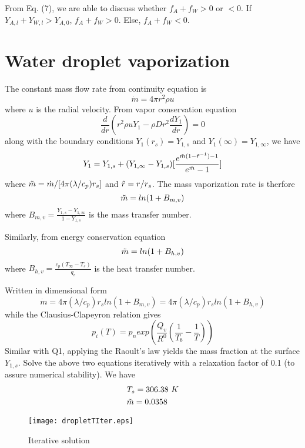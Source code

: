 \documentclass{article}
\begin{document}
From Eq. (7), we are able to discuss whether $f_A+f_W>0$ or $<0$. If $Y_{A,l}+Y_{W,l}>Y_{A,0}$, $f_A+f_W>0$. Else, $f_A+f_W<0$.



\section{Water droplet vaporization}
The constant mass flow rate from continuity equation is
\begin{equation}
    \dot{m}=4\pi r^2 \rho u
\end{equation}
where $u$ is the radial velocity. From vapor conservation equation
\begin{equation}
    \frac{d}{dr}(r^2\rho u Y_1-\rho Dr^2\frac{dY_1}{dr})=0
\end{equation}
along with the boundary conditions $Y_1(r_s)=Y_{1,s}$ and $Y_1(\infty)=Y_{1,\infty}$, we have
\begin{equation}
    Y_1 = Y_{1,s}+(Y_{1,\infty}-Y_{1,s})[\frac{e^{\Tilde{m}(1-\Tilde{r}^{-1})-1}}{e^{\Tilde{m}}-1}]
\end{equation}
where $\Tilde{m}=\dot{m}/[4\pi (\lambda /c_p)r_s]$ and $\Tilde{r}=r/r_s$.
The mass vaporization rate is therfore
\begin{equation}
    \Tilde{m}=ln(1+B_{m,v})
\end{equation}
where $B_{m,v}=\frac{Y_{1,s}-Y_{1,\infty}}{1-Y_{1,s}}$ is the mass transfer number.

Similarly, from energy conservation equation
\begin{equation}
    \Tilde{m}=ln(1+B_{h,v})
\end{equation}
where $B_{h,v}=\frac{c_p(T_\infty - T_s)}{q_v}$ is the heat transfer number.

Written in dimensional form
\begin{equation}
    \dot{m} = 4\pi (\lambda /c_p)r_s ln(1+B_{m,v}) = 4\pi (\lambda /c_p)r_s ln(1+B_{h,v})
\end{equation}
while the Clausius-Clapeyron relation gives
\begin{equation}
    p_i(T)=p_n exp(\frac{Q_v}{R^0}(\frac{1}{T_b} - \frac{1}{T}))
\end{equation}
Similar with Q1, applying the Raoult's law yields the mass fraction at the surface $Y_{1,s}$. Solve the above two equations iteratively with a relaxation factor of 0.1 (to assure numerical stability). We have
\begin{equation}
\begin{aligned}
    & T_s = 306.38\ K\\
    & \Tilde{m} = 0.0358
\end{aligned}
\end{equation}
\begin{figure}[htpb]
\centering
\texttt{[image: dropletTIter.eps]}
\caption{Iterative solution}
\label{fig:dropletTIter.eps}
\end{figure}
\end{document}
